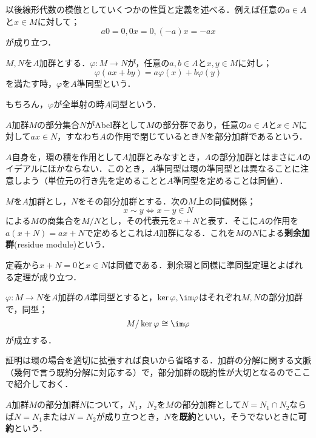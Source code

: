 以後線形代数の模倣としていくつかの性質と定義を述べる．例えば任意の$a\in A$と$x\in M$に対して；
\[a0=0,0x=0,(-a)x=-ax\]
が成り立つ．

\begin{defi}[準同型]
	$M,N$を$A$加群とする．$\varphi:M\to N$が，任意の$a,b\in A$と$x,y\in M$に対し；
	\[\varphi(ax+by)=a\varphi(x)+b\varphi(y)\]
	を満たす時，$\varphi$を$A$準同型という．
\end{defi}

もちろん，$\varphi$が全単射の時$A$同型という．

\begin{defi}[部分加群]
	$A$加群$M$の部分集合$N$がAbel群として$M$の部分群であり，任意の$a\in A$と$x\in N$に対して$ax\in N，$すなわち$A$の作用で閉じているとき$N$を部分加群であるという．
\end{defi}

$A$自身を，環の積を作用として$A$加群とみなすとき，$A$の部分加群とはまさに$A$のイデアルにほかならない．このとき，$A$準同型は環の準同型とは異なることに注意しよう（単位元の行き先を定めることと$A$準同型を定めることは同値）．

\begin{defi}[剰余加群]
	$M$を$A$加群とし，$N$をその部分加群とする．次の$M$上の同値関係；
	\[x\sim y\Longleftrightarrow x-y\in N\]
	による$M$の商集合を$M/N$とし，その代表元を$x+N$と表す．そこに$A$の作用を$a(x+N)=ax+N$で定めるとこれは$A$加群になる．これを$M$の$N$による\textbf{剰余加群}(residue module)という．
\end{defi}

定義から$x+N=0$と$x\in N$は同値である．剰余環と同様に準同型定理とよばれる定理が成り立つ．

\begin{thm}[準同型定理]
	$\varphi:M\to N$を$A$加群の$A$準同型とすると，$\ker\varphi,\im\varphi$はそれぞれ$M,N$の部分加群で，同型；
	\[M/\ker\varphi\cong\im\varphi\]
	が成立する．
\end{thm}

証明は環の場合を適切に拡張すれば良いから省略する．加群の分解に関する文脈（幾何で言う既約分解に対応する）で，部分加群の既約性が大切となるのでここで紹介しておく．

\begin{defi}\label{defi:既約部分加群}
	$A$加群$M$の部分加群$N$について，$N_1，N_2$を$M$の部分加群として$N=N_1\cap N_2$ならば$N=N_1$または$N=N_2$が成り立つとき，$N$を\textbf{既約}といい，そうでないときに\textbf{可約}という．
\end{defi}

